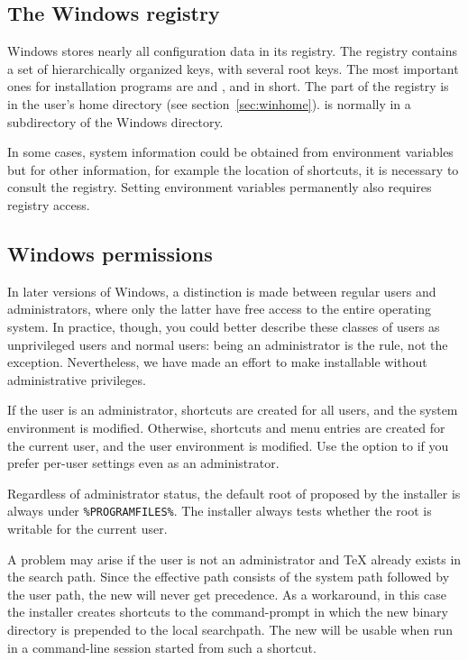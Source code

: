 \documentclass{article}
\begin{document}
\subsection{The Windows registry}
\label{sec:registry}

Windows stores nearly all configuration data in its registry.  The
registry contains a set of hierarchically organized keys, with several
root keys. The most important ones for installation programs are
 and ,  and
 in short. The  part of the registry is in the
user's home directory (see section~\ref{sec:winhome}).   is
normally in a subdirectory of the Windows directory.

In some cases, system information could be obtained from environment
variables but for other information, for example the location of
shortcuts, it is necessary to consult the registry.  Setting environment
variables permanently also requires registry access.


\subsection{Windows permissions}
\label{sec:winpermissions}

In later versions of Windows, a distinction is made between regular
users and administrators, where only the latter have free access to the
entire operating system. In practice, though, you could better describe
these classes of users as unprivileged users and normal users: being an
administrator is the rule, not the exception. Nevertheless, we have made
an effort to make \TL{} installable without administrative privileges.

If the user is an administrator, shortcuts are created for all users,
and the system environment is modified. Otherwise, shortcuts and menu
entries are created for the current user, and the user environment is
modified.  Use the  option to  if
you prefer per-user settings even as an administrator.

Regardless of administrator status, the default root of \TL{} proposed
by the installer is always under \verb|%PROGRAMFILES%|. The installer
always tests whether the root is writable for the current user.

A problem may arise if the user is not an administrator and \TeX{}
already exists in the search path.  Since the effective path consists of
the system path followed by the user path, the new \TL{} will never get
precedence.  As a workaround, in this case the installer creates
shortcuts to the command-prompt in which the new \TL{} binary directory
is prepended to the local searchpath.  The new \TL{} will be usable when
run in a command-line session started from such a shortcut.
\end{document}
